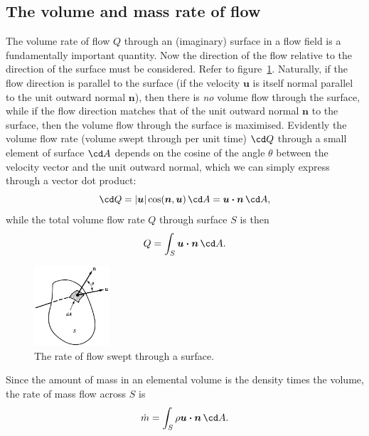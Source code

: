 \documentclass[twoside,11pt]		{report}
\begin{document}
\subsection{The volume and mass rate of flow}

The volume rate of flow $Q$ through an (imaginary) surface in a flow
field is a fundamentally important quantity. Now the direction of the
flow relative to the direction of the surface must be
considered. Refer to figure~\ref{fig.flowQ}. Naturally, if the flow
direction is parallel to the surface (\ie if the velocity $\bm{u}$ is
itself normal parallel to the unit outward normal $\bm{n}$), then
there is \emph{no} volume flow through the surface, while if the flow
direction matches that of the unit outward normal $\bm{n}$ to the
surface, then the volume flow through the surface is
maximised. Evidently the volume flow rate (volume swept through per
unit time) $\cd Q$ through a small element of surface $\cd A$ depends
on the cosine of the angle $\theta$ between the velocity vector and
the unit outward normal, which we can simply express through a vector
dot product:
\[
\cd Q=|\bm{u}| \cos(\bm{n}, \bm{u})\,\cd A = \bm{u\cdot n}\,\cd A,
\]
while the total volume flow rate $Q$ through surface $S$ is then
\[
Q = \int_S \bm{u\cdot n}\,\cd A.
\]

\begin{figure}
\begin{center}
\includegraphics[width=0.25\textwidth]{White-1.3a.eps}
\end{center}
\caption{The rate of flow swept through a surface. \citep[From][]{white86}}
\label{fig.flowQ}
\end{figure}

Since the amount of mass in an elemental volume is the density times
the volume, the rate of mass flow across $S$ is
\[
\dot{m}=\int_S \rho\bm{u\cdot n}\,\cd A.
\]
\end{document}
